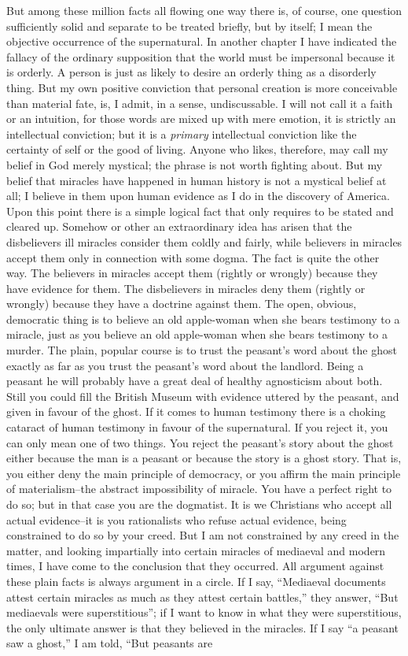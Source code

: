 \documentclass{book}
\begin{document}
But among these million facts all flowing one way there is, of course, one question sufficiently solid and separate to be treated briefly, but by itself; I mean the objective occurrence of the supernatural. In another chapter I have indicated the fallacy of the ordinary supposition that the world must be impersonal because it is orderly. A person is just as likely to desire an orderly thing as a disorderly thing. But my own positive conviction that personal creation is more conceivable than material fate, is, I admit, in a sense, undiscussable. I will not call it a faith or an intuition, for those words are mixed up with mere emotion, it is strictly an intellectual conviction; but it is a \emph{primary} intellectual conviction like the certainty of self or the good of living. Anyone who likes, therefore, may call my belief in God merely mystical; the phrase is not worth fighting about. But my belief that miracles have happened in human history is not a mystical belief at all; I believe in them upon human evidence as I do in the discovery of America. Upon this point there is a simple logical fact that only requires to be stated and cleared up. Somehow or other an extraordinary idea has arisen that the disbelievers ill miracles consider them coldly and fairly, while believers in miracles accept them only in connection with some dogma. The fact is quite the other way. The believers in miracles accept them (rightly or wrongly) because they have evidence for them. The disbelievers in miracles deny them (rightly or wrongly) because they have a doctrine against them. The open, obvious, democratic thing is to believe an old apple-woman when she bears testimony to a miracle, just as you believe an old apple-woman when she bears testimony to a murder. The plain, popular course is to trust the peasant’s word about the ghost exactly as far as you trust the peasant’s word about the landlord. Being a peasant he will probably have a great deal of healthy agnosticism about both. Still you could fill the British Museum with evidence uttered by the peasant, and given in favour of the ghost. If it comes to human testimony there is a choking cataract of human testimony in favour of the supernatural. If you reject it, you can only mean one of two things. You reject the peasant’s story about the ghost either because the man is a peasant or because the story is a ghost story. That is, you either deny the main principle of democracy, or you affirm the main principle of materialism–the abstract impossibility of miracle. You have a perfect right to do so; but in that case you are the dogmatist. It is we Christians who accept all actual evidence–it is you rationalists who refuse actual evidence, being constrained to do so by your creed. But I am not constrained by any creed in the matter, and looking impartially into certain miracles of mediaeval and modern times, I have come to the conclusion that they occurred. All argument against these plain facts is always argument in a circle. If I say, “Mediaeval documents attest certain miracles as much as they attest certain battles,” they answer, “But mediaevals were superstitious”; if I want to know in what they were superstitious, the only ultimate answer is that they believed in the miracles. If I say “a peasant saw a ghost,” I am told, “But peasants are 
\end{document}
